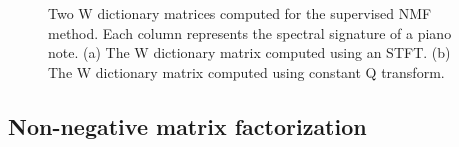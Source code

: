 \documentclass[5p]{elsarticle}
\begin{document}
\begin{figure}[t]
\begin{center}
\end{center}
\caption{ Two W dictionary matrices computed for the supervised NMF method. Each column represents the spectral signature of a piano note. (a) The W dictionary matrix computed using an STFT. (b) The W dictionary matrix computed using constant Q transform.}
\end{figure}

\subsection{Non-negative matrix factorization}
\end{document}
